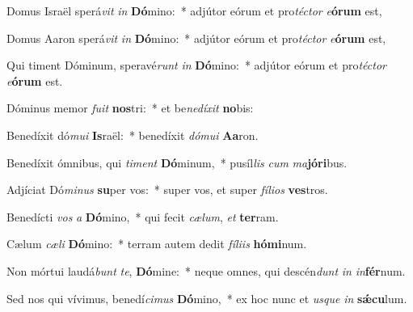 \item Domus Israël sperá\textit{vit} \textit{in} \textbf{Dó}mino:~* adjútor eórum et pro\textit{téc}\textit{tor} \textit{e}\textbf{ó}\textbf{rum} est,
\item Domus Aaron sperá\textit{vit} \textit{in} \textbf{Dó}mino:~* adjútor eórum et pro\textit{téc}\textit{tor} \textit{e}\textbf{ó}\textbf{rum} est,
\item Qui timent Dóminum, speravé\textit{runt} \textit{in} \textbf{Dó}mino:~* adjútor eórum et pro\textit{téc}\textit{tor} \textit{e}\textbf{ó}\textbf{rum} est.
\item Dóminus memor \textit{fu}\textit{it} \textbf{nos}tri:~* et be\textit{ne}\textit{dí}\textit{xit} \textbf{no}bis:
\item Benedíxit dó\textit{mu}\textit{i} \textbf{Is}raël:~* benedíxit \textit{dó}\textit{mu}\textit{i} \textbf{A}\textbf{a}ron.
\item Benedíxit ómnibus, qui \textit{ti}\textit{ment} \textbf{Dó}minum,~* pusíl\textit{lis} \textit{cum} \textit{ma}\textbf{jó}\textbf{ri}bus.
\item Adjíciat Dó\textit{mi}\textit{nus} \textbf{su}per vos:~* super vos, et super \textit{fí}\textit{li}\textit{os} \textbf{ves}tros.
\item Benedícti \textit{vos} \textit{a} \textbf{Dó}mino,~* qui fecit \textit{cæ}\textit{lum}, \textit{et} \textbf{ter}ram.
\item Cælum \textit{cæ}\textit{li} \textbf{Dó}mino:~* terram autem dedit \textit{fí}\textit{li}\textit{is} \textbf{hó}\textbf{mi}num.
\item Non mórtui laudá\textit{bunt} \textit{te}, \textbf{Dó}mine:~* neque omnes, qui descén\textit{dunt} \textit{in} \textit{in}\textbf{fér}num.
\item Sed nos qui vívimus, benedí\textit{ci}\textit{mus} \textbf{Dó}mino,~* ex hoc nunc et \textit{us}\textit{que} \textit{in} \textbf{sǽ}\textbf{cu}lum.
